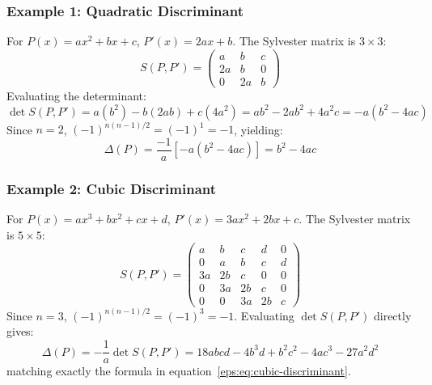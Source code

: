 \documentclass[a4paper]{article}
\begin{document}
\subsubsection{Example 1: Quadratic Discriminant}
For $P(x) = a x^2 + b x + c$, $P'(x) = 2a x + b$. The Sylvester matrix is $3 \times 3$:
\[
    S(P, P') = 
    \begin{pmatrix}
        a & b & c \\
        2a & b & 0 \\
        0 & 2a & b
    \end{pmatrix}
\]
Evaluating the determinant:
\[
    \det S(P, P') = a(b^2) - b(2ab) + c(4a^2) = a b^2 - 2a b^2 + 4a^2 c = -a(b^2 - 4ac)
\]
Since $n=2$, $(-1)^{n(n-1)/2} = (-1)^1 = -1$, yielding:
\[
    \Delta(P) = \frac{-1}{a} \left[ -a(b^2 - 4ac) \right] = b^2 - 4ac
\]

\subsubsection{Example 2: Cubic Discriminant}
For $P(x) = a x^3 + b x^2 + c x + d$, $P'(x) = 3a x^2 + 2b x + c$. The Sylvester matrix is $5 \times 5$:
\[
    S(P, P') = 
    \begin{pmatrix}
        a & b & c & d & 0 \\
        0 & a & b & c & d \\
        3a & 2b & c & 0 & 0 \\
        0 & 3a & 2b & c & 0 \\
        0 & 0 & 3a & 2b & c
    \end{pmatrix}
\]
Since $n=3$, $(-1)^{n(n-1)/2} = (-1)^3 = -1$. Evaluating $\det S(P, P')$ directly gives:
\[
    \Delta(P) = -\frac{1}{a} \det S(P, P') = 18abcd - 4b^3d + b^2c^2 - 4ac^3 - 27a^2d^2
\]
matching exactly the formula in equation~\eqref{eps:eq:cubic-discriminant}.
\end{document}
